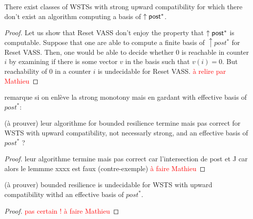 \begin{proposition}
There exist classes of WSTSs with strong upward compatibility for which there don't exist an algorithm computing a basis of $\uparrow \textsf{post}^*$.
\end{proposition}


\begin{proof}
Let us show that Reset VASS don't enjoy the property that $\uparrow \textsf{post}^*$ is computable.
Suppose that one are able to compute a finite basis of $\uparrow post^*$ for Reset VASS. Then, one would be able to decide whether $0$ is reachable in counter $i$ by examining if there is some vector $v$ in the basis such that $v(i)=0$. But reachability of $0$ in a counter $i$ is undecidable for Reset VASS. 
\textcolor{red}{à relire par Mathieu}
\end{proof}


remarque si on enlève la strong monotony mais en gardant with effective basis of $post^*$:


\begin{proposition}(à prouver)
 leur algorithme for {\sc bounded resilience} termine mais pas correct for WSTS with upward compatibility, not necessarly strong, and an effective basis of $post^*$ ?
\end{proposition}

\begin{proof}
leur algorithme termine mais pas correct car l'intersection de post et J car alors le lemmme xxxx est faux (contre-exemple)
 \textcolor{red}{à faire Mathieu}
 
 
\end{proof}

\begin{proposition}(à prouver)
{\sc bounded resilience} is undecidable for WSTS with upward compatibility withd an effective basis of $post^*$.
\end{proposition}

\begin{proof}
 \textcolor{red}{pas certain ! à faire Mathieu}
\end{proof}

